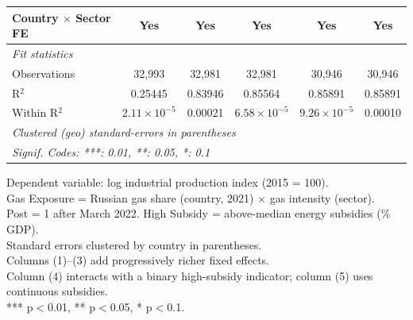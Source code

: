 \begin{table}[htbp]
\begin{tabular}{lccccc}
      Country $\times$ Sector FE                            & Yes                   & Yes             & Yes                   & Yes                   & Yes\\  
      \midrule
      \emph{Fit statistics}\\
      Observations                                          & 32,993                & 32,981          & 32,981                & 30,946                & 30,946\\  
      R$^2$                                                 & 0.25445               & 0.83946         & 0.85564               & 0.85891               & 0.85891\\  
      Within R$^2$                                          & $2.11\times 10^{-5}$  & 0.00021         & $6.58\times 10^{-5}$  & $9.26\times 10^{-5}$  & 0.00010\\  
      \midrule \midrule
      \multicolumn{6}{l}{\emph{Clustered (geo) standard-errors in parentheses}}\\
      \multicolumn{6}{l}{\emph{Signif. Codes: ***: 0.01, **: 0.05, *: 0.1}}\\
   \end{tabular}
   
   \par \raggedright 
   Dependent variable: log industrial production index (2015 = 100).\\
   Gas Exposure = Russian gas share (country, 2021) $\times$ gas intensity (sector).\\
   Post = 1 after March 2022. High Subsidy = above-median energy subsidies (\% GDP).\\
   Standard errors clustered by country in parentheses.\\
   Columns (1)--(3) add progressively richer fixed effects.\\
   Column (4) interacts with a binary high-subsidy indicator; column (5) uses continuous subsidies.\\
   *** p$<$0.01, ** p$<$0.05, * p$<$0.1.
\end{table}


